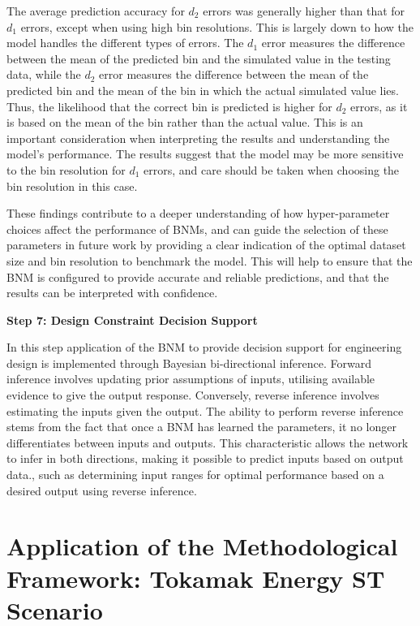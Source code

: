 \documentclass[journal]{IEEEtran}
\begin{document}
The average prediction accuracy for $d_{2}$ errors was generally higher than that for $d_{1}$ errors, except when using high bin resolutions. This is largely down to how the model handles the different types of errors. The $d_{1}$ error measures the difference between the mean of the predicted bin and the simulated value in the testing data, while the $d_{2}$ error measures the difference between the mean of the predicted bin and the mean of the bin in which the actual simulated value lies. Thus, the likelihood that the correct bin is predicted is higher for $d_{2}$ errors, as it is based on the mean of the bin rather than the actual value. This is an important consideration when interpreting the results and understanding the model's performance. The results suggest that the model may be more sensitive to the bin resolution for $d_{1}$ errors, and care should be taken when choosing the bin resolution in this case.

These findings contribute to a deeper understanding of how hyper-parameter choices affect the performance of BNMs, and can guide the selection of these parameters in future work by providing a clear indication of the optimal dataset size and bin resolution to benchmark the model. This will help to ensure that the BNM is configured to provide accurate and reliable predictions, and that the results can be interpreted with confidence.

\textbf{Step 7: Design Constraint Decision Support}

In this step application of the BNM to provide decision support for engineering design is implemented through Bayesian bi-directional inference. Forward inference involves updating prior assumptions of inputs, utilising available evidence to give the output response. Conversely, reverse inference involves estimating the inputs given the output. The ability to perform reverse inference stems from the fact that once a BNM has learned the parameters, it no longer differentiates between inputs and outputs. This characteristic allows the network to infer in both directions, making it possible to predict inputs based on output data., such as determining input ranges for optimal performance based on a desired output using reverse inference. 

\section{Application of the Methodological Framework: Tokamak Energy ST Scenario}\label{sec:res_decision} 
\end{document}
